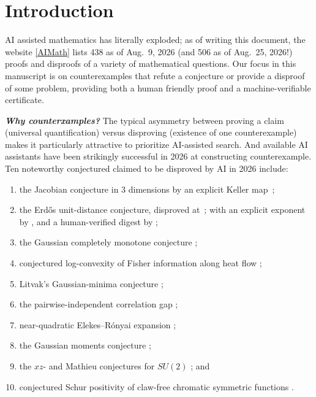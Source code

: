 \section{Introduction}
\noindent AI assisted mathematics has literally exploded; as of writing this document, the website \href{https://aimath.robertj1.com}{[AIMath]} lists 438 as of Aug.~9, 2026 (and 506 as of Aug.~25, 2026!) proofs and disproofs of a variety of mathematical questions. Our focus in this manuscript is on counterexamples that refute a conjecture or provide a disproof of some problem, providing both a human friendly proof and a machine-verifiable certificate. 

\vskip5pt
\noindent\textbf{\emph{Why counterxamples?}} The typical asymmetry between proving a claim (universal quantification) versus disproving (existence of one counterexample) makes it particularly attractive to prioritize AI-assisted search. And available AI assistants have been strikingly successful in 2026 at constructing counterexample. Ten noteworthy conjectured claimed to be disproved by AI in 2026 include:
\vskip5pt
\begin{small}
  \begin{enumerate}[label=(\roman*),itemsep=0pt]
  \item the Jacobian conjecture in 3 dimensions by an explicit Keller map~\citep{Alpoge2026}; %
  \item the Erd\H{o}s unit-distance conjecture, disproved at~\citet{OpenAIUnitDistance2026}; with an explicit exponent by \citet{Sawin2026}, and a human-verified digest by \citet{UnitDistanceRemarks2026};
  \item the Gaussian completely monotone conjecture \citep{GuSellke2026};
  \item conjectured log-convexity of Fisher information along heat flow \citep{ZouEtAl2026};
  \item Litvak's Gaussian-minima conjecture \citep{Kunisky2026};
  \item the pairwise-independent correlation gap \citep{RamachandraNatarajan2026};
  \item near-quadratic Elekes--R\'onyai expansion \citep{Liu2026};
  \item the Gaussian moments conjecture \citep{LongGaussian2026};
  \item the $xz$- and Mathieu conjectures for $SU(2)$ \citep{LongSU22026}; and
  \item conjectured Schur positivity of claw-free chromatic symmetric functions
    \citep{MatherneMorales2026}.
  \end{enumerate}
\end{small}

